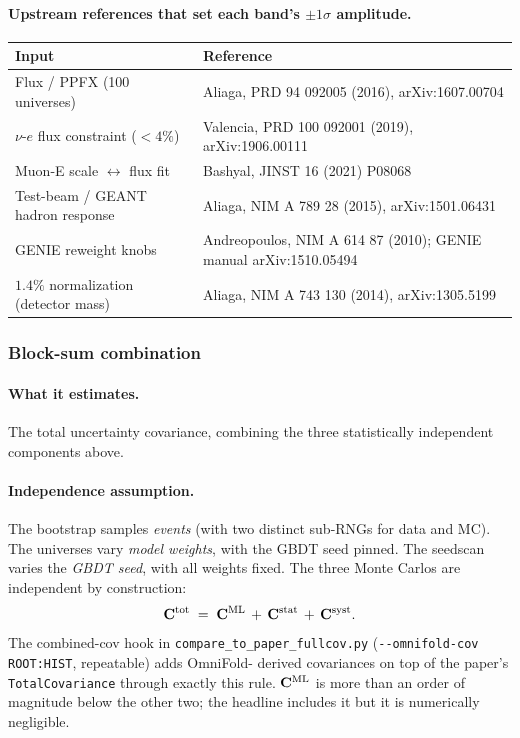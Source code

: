\paragraph{Upstream references that set each band's $\pm1\sigma$ amplitude.}
\begin{center}
\begin{tabular}{@{}l@{\quad}p{}@{}}
\toprule
Input & Reference \\
\midrule
Flux / PPFX (100 universes) & Aliaga, PRD 94 092005 (2016), arXiv:1607.00704 \\
$\nu$-$e$ flux constraint ($<4\%$) & Valencia, PRD 100 092001 (2019), arXiv:1906.00111 \\
Muon-E scale $\leftrightarrow$ flux fit & Bashyal, JINST 16 (2021) P08068 \\
Test-beam / GEANT hadron response & Aliaga, NIM A 789 28 (2015), arXiv:1501.06431 \\
GENIE reweight knobs & Andreopoulos, NIM A 614 87 (2010); GENIE manual arXiv:1510.05494 \\
$1.4\%$ normalization (detector mass) & Aliaga, NIM A 743 130 (2014), arXiv:1305.5199 \\
\bottomrule
\end{tabular}
\end{center}

\subsubsection{Block-sum combination}
\label{sec:combine}

\paragraph{What it estimates.}
The total uncertainty covariance, combining the three statistically
independent components above.

\paragraph{Independence assumption.}
The bootstrap samples \emph{events} (with two distinct sub-RNGs for
data and MC). The universes vary \emph{model weights}, with the GBDT
seed pinned. The seedscan varies the \emph{GBDT seed}, with all
weights fixed. The three Monte Carlos are independent by
construction:
\begin{equation}
\mathbf{C}^{\text{tot}}
\;=\;
\mathbf{C}^{\text{ML}} \,+\, \mathbf{C}^{\text{stat}} \,+\, \mathbf{C}^{\text{syst}}.
\label{eq:blocksum}
\end{equation}
The combined-cov hook in \texttt{compare\_to\_paper\_fullcov.py}
(\texttt{-{}-omnifold-cov ROOT:HIST}, repeatable) adds OmniFold-
derived covariances on top of the paper's \texttt{TotalCovariance}
through exactly this rule. $\mathbf{C}^{\text{ML}}$ is more than an order of
magnitude below the other two; the headline includes it but it is
numerically negligible.


